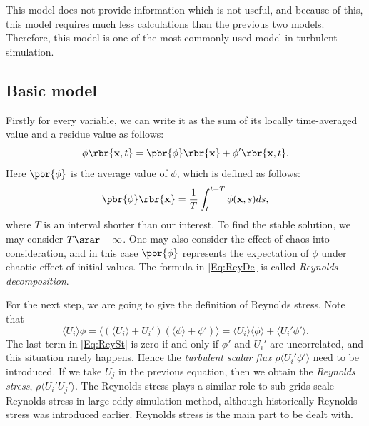 \documentclass[english, nochinese]{pkupaper}
\begin{document}
This model does not provide information which is not useful, and because of this, this model requires much less calculations than the previous two models. Therefore, this model is one of the most commonly used model in turbulent simulation.

\subsection{Basic model}

Firstly for every variable, we can write it as the sum of its locally time-averaged value and a residue value as follows:
\begin{equation}\label{Eq:ReyDe}
\phi\rbr{ \mathbf{x} , t} = \pbr{\phi}\rbr{\mathbf{x}} + \phi'\rbr{\mathbf{x}, t}.
\end{equation}
Here $\pbr{\phi}$ is the average value of $\phi$, which is defined as follows:
\begin{equation}
\pbr{\phi} \rbr{\mathbf{x}} = \frac{1}{T} \int_t^{t+T}\phi(\mathbf{x}, s)ds,
\end{equation}
where $T$ is an interval shorter than our interest. To find the stable solution, we may consider $ T \srar +\infty $. One may also consider the effect of chaos into consideration, and in this case $\pbr{\phi}$ represents the expectation of $\phi$ under chaotic effect of initial values. The formula in \eqref{Eq:ReyDe} is called \emph{Reynolds decomposition}.

For the next step, we are going to give the definition of Reynolds stress. Note that
\begin{equation}\label{Eq:ReySt}
\langle U_i\rangle\phi = \langle(\langle U_i\rangle+U_i')(\langle\phi\rangle+\phi')\rangle = \langle U_i\rangle\langle\phi\rangle + \langle U_i'\phi'\rangle.
\end{equation}
The last term in \eqref{Eq:ReySt} is zero if and only if $\phi'$ and $U_i'$ are uncorrelated, and this situation rarely happens. Hence the \emph{turbulent scalar flux} $\rho\langle U_i'\phi'\rangle$ need to be introduced. If we take $U_j$ in the previous equation, then we obtain the \emph{Reynolds stress}, $\rho\langle U_i'U_j'\rangle$. The Reynolds stress plays a similar role to sub-grids scale Reynolds stress in large eddy simulation method, although historically Reynolds stress was introduced earlier. Reynolds stress is the main part to be dealt with.
\end{document}
